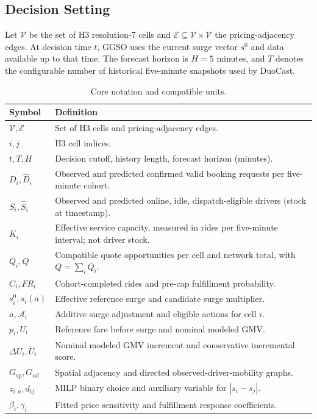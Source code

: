 \documentclass[a4paper,10pt,twocolumn]{article}
\newcommand{\Vset}{\mathcal V}
\newcommand{\Edge}{\mathcal E}
\begin{document}
\subsection{Decision Setting}
Let $\Vset$ be the set of H3 resolution-7 cells and
$\Edge\subseteq\Vset\times\Vset$ the pricing-adjacency edges. At decision
time $t$, GGSO uses the current surge vector $s^0$ and data available up to
that time. The forecast horizon is $H=5$ minutes, and $T$ denotes the
configurable number of historical five-minute snapshots used by DuoCast.

\begin{table}[H]
\centering
\caption{Core notation and compatible units.}
\label{tab:notation}
\footnotesize
\begin{tabularx}{\columnwidth}{@{}p{}X@{}}
\toprule
\textbf{Symbol} & \textbf{Definition}\\
\midrule
$\mathcal V,\mathcal E$ & Set of H3 cells and pricing-adjacency edges.\\
$i,j$ & H3 cell indices.\\
$t,T,H$ & Decision cutoff, history length, forecast horizon (minutes).\\
$D_i,\widehat D_i$ & Observed and predicted confirmed valid booking requests per five-minute cohort.\\
$S_i,\widehat S_i$ & Observed and predicted online, idle, dispatch-eligible drivers (stock at timestamp).\\
$K_i$ & Effective service capacity, measured in rides per five-minute interval; not driver stock.\\
$Q_i,Q$ & Compatible quote opportunities per cell and network total, with $Q=\sum_iQ_i$.\\
$C_i,FR_i$ & Cohort-completed rides and pre-cap fulfillment probability.\\
$s_i^0,s_i(a)$ & Effective reference surge and candidate surge multiplier.\\
$a,\mathcal A_i$ & Additive surge adjustment and eligible actions for cell $i$.\\
$p_i,U_i$ & Reference fare before surge and nominal modeled GMV.\\
$\Delta U_i,\widetilde U_i$ & Nominal modeled GMV increment and conservative incremental score.\\
$G_{\mathrm{sp}},G_{\mathrm{od}}$ & Spatial adjacency and directed observed-driver-mobility graphs.\\
$z_{i,a},d_{ij}$ & MILP binary choice and auxiliary variable for $|s_i-s_j|$.\\
$\beta_i,\gamma_i$ & Fitted price sensitivity and fulfillment response coefficients.\\
\bottomrule
\end{tabularx}
\end{table}
\end{document}
